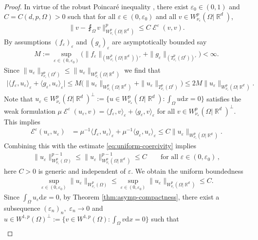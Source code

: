 \documentclass[12pt, reqno]{amsart}%
\theoremstyle{plain}  %
\theoremstyle{definition}  %
\numberwithin{equation}{section}
\DeclareMathOperator{\cE}{\mathcal{E}}
\DeclareMathOperator{\R}{\mathbb{R}}
\renewcommand{\d}{\mathrm{d}}
\newcommand{\eps}{\varepsilon}
\newcommand{\WnuOmRa}{W^p_{\nu_\eps}(\Omega|\R^d )}
\newcommand{\TnuOma}{T^p_{\nu_\eps} (\Omega^c)}
\newcommand{\WnuOma}{W^{p}_{\nu_\eps}(\Omega)}
\begin{document}
\begin{proof}
In virtue of the robust Poincar\'e inequality \cite[Corollary 10.2]{Fog25}, there exist $\eps_0\in (0,1)$ and $C= C(d,p,\Omega)>0$ such that for all $\eps\in (0, \eps_0)$ and all  $v \in\WnuOmRa$,
%
\begin{align}\label{eq:uniform-coercivity}
\|v-\mbox{$\fint_{\Omega} v$}\|^p_{\WnuOmRa}\leq C\cE^\eps(v,v).
\end{align}
\noindent By assumptions  $(f_\eps)_\eps$ and $(g_\eps)_\eps$ are asymptotically bounded  say
\begin{align*}
M:=\sup_{\eps\in (0,\eps_0)}\big(\|f_\eps\|_{(W^p_{\nu_\eps}(\Omega|\R^d))'}+ \|g_\eps\|_{(T^p_{\nu_\eps}(\Omega^c))'}\big)<\infty.
\end{align*}
Since $\|u_\eps\|_{\TnuOma}\leq \|u_\eps\|_{\WnuOmRa}$ we find that
\begin{align*}
\big| \langle  f_\eps ,u_\eps \rangle_\eps + \langle   g_\eps, u_\eps \rangle_\eps  \big|
\leq M\big(\|u_\eps\|_{\WnuOmRa}+ \|u_\eps\|_{\TnuOma}\big)\leq 2M\|u_\eps\|_{\WnuOmRa}.
\end{align*}
Note that $ u_\eps\in \WnuOmRa^\perp :=  \big\{ u\in \WnuOmRa: \int_{\Omega}u\d x=0\big\}$ satisfies
the weak formulation $\mu \cE^\eps(u_\eps, v) = \langle  f_\eps ,v \rangle_\eps + \langle   g_\eps, v \rangle_\eps$ for all $v\in \WnuOmRa^\perp$. This implies
%
\begin{align*}
\mathcal{E}^\eps(u_\eps,u_\eps)
&= \mu^{-1}\langle  f_\eps ,u_\eps \rangle_\eps + \mu ^{-1} \langle   g_\eps, u_\eps  \rangle_\eps\leq  C \|u_\eps\|_{\WnuOmRa}.
\end{align*}
Combining this with the estimate   \eqref{eq:uniform-coercivity} implies
%
\begin{align*}
\|u_\eps\|^{p-1}_{\WnuOma}\leq \|u_\eps\|^{p-1}_{\WnuOmRa}\leq C\qquad\text{for all } \eps\in (0,\eps_0)\,,
\end{align*}
  here   $C>0$ is generic and independent of $\eps$. We obtain the uniform boundedness
\begin{align}\label{eq:uniform-boundednessm}
\sup_{\eps\in (0,\eps_0)}\|u_\eps\|_{\WnuOma}\leq \sup_{\eps\in (0,\eps_0)} \|u_\eps\|_{\WnuOmRa}\leq C.
\end{align}
Since $\int_\Omega u_\eps\d x=0$,  by Theorem \ref{thm:asymp-compactness}, there exist   a subsequence $(\eps_n)_n,$ $\eps_n\to 0$ and  $u\in W^{1,p}(\Omega)^\perp:= \big\{ v\in W^{1,p}(\Omega): \int_{\Omega}v\d x=0\big\}$ such that
\begin{align}\label{eq:BBM-liminf}

\end{align}
\end{proof}
\end{document}
